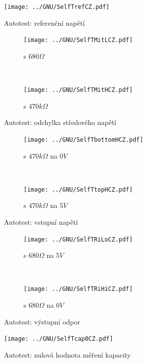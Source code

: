 \begin{figure}[H]
  \centering
  \texttt{[image: ../GNU/SelfTrefCZ.pdf]}
  \caption{Autotest: referenční napětí}
  \label{fig:SelfTref}
\end{figure}

\begin{figure}[H]
  \begin{subfigure}[b]{.5\textwidth}
    \centering
    \texttt{[image: ../GNU/SelfTMitLCZ.pdf]}
    \caption{s \(680 \Omega\)}
    \label{fig:SelfTMitL}
  \end{subfigure}
  ~
  \begin{subfigure}[b]{.5\textwidth}
    \centering
    \texttt{[image: ../GNU/SelfTMitHCZ.pdf]}
    \caption{s \(470 k\Omega\)}
    \label{fig:SelfTMitH}
  \end{subfigure}
  \caption{Autotest: odchylka středového napětí}
\end{figure}

\begin{figure}[H]
  \begin{subfigure}[b]{.5\textwidth}
  \centering
    \texttt{[image: ../GNU/SelfTbottomHCZ.pdf]}
    \caption{s \(470k\Omega\) na \(0V\)}
    \label{fig:SelfTlowH}
  \end{subfigure}
  ~
  \begin{subfigure}[b]{.5\textwidth}
  \centering
    \texttt{[image: ../GNU/SelfTtopHCZ.pdf]}
    \caption{s \(470k\Omega\) na \(5V\)}
    \label{fig:SelfTtopH}
  \end{subfigure}
  \caption{Autotest: vstupní napětí}
\end{figure}

\begin{figure}[H]
  \begin{subfigure}[b]{.5\textwidth}
  \centering
    \texttt{[image: ../GNU/SelfTRiLoCZ.pdf]}
    \caption{s \(680\Omega\) na \(5V\)}
    \label{fig:SelfTRoL}
  \end{subfigure}
  ~
  \begin{subfigure}[b]{.5\textwidth}
  \centering
    \texttt{[image: ../GNU/SelfTRiHiCZ.pdf]}
    \caption{s \(680\Omega\) na \(0V\)}
    \label{fig:SelfTRoH}
  \end{subfigure}
  \caption{Autotest: výstupní odpor}
\end{figure}

\begin{figure}[H]
  \centering
  \texttt{[image: ../GNU/SelfTcap0CZ.pdf]}
  \caption{Autotest: nulová hodnota měření kapacity}
  \label{fig:SelfTcap}
\end{figure}

